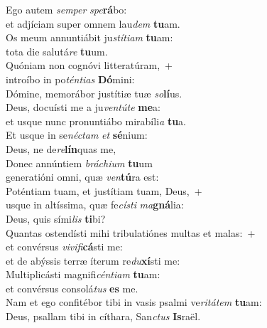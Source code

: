 \evenverse Ego autem \textit{sem}\textit{per} \textit{spe}\textbf{rá}bo:~\*\\
\evenverse et adjíciam super omnem lau\textit{dem} \textbf{tu}am.\\
\oddverse Os meum annuntiábit ju\textit{stí}\textit{ti}\textit{am} \textbf{tu}am:~\*\\
\oddverse tota die salutá\textit{re} \textbf{tu}um.\\
\evenverse Quóniam non cognóvi litteratúram,~+\\
\evenverse  introíbo in po\textit{tén}\textit{ti}\textit{as} \textbf{Dó}mini:~\*\\
\evenverse Dómine, memorábor justítiæ tuæ \textit{so}\textbf{lí}us.\\
\oddverse Deus, docuísti me a ju\textit{ven}\textit{tú}\textit{te} \textbf{me}a:~\*\\
\oddverse et usque nunc pronuntiábo mirabíli\textit{a} \textbf{tu}a.\\
\evenverse Et usque in se\textit{né}\textit{ctam} \textit{et} \textbf{sé}nium:~\*\\
\evenverse Deus, ne de\textit{re}\textbf{lín}quas me,\\
\oddverse Donec annúntiem \textit{brá}\textit{chi}\textit{um} \textbf{tu}um~\*\\
\oddverse generatióni omni, quæ \textit{ven}\textbf{tú}ra est:\\
\evenverse Poténtiam tuam, et justítiam tuam, Deus,~+\\
\evenverse  usque in altíssima, quæ fe\textit{cí}\textit{sti} \textit{ma}\textbf{gná}lia:~\*\\
\evenverse Deus, quis sími\textit{lis} \textbf{ti}bi?\\
\oddverse Quantas ostendísti mihi tribulatiónes multas et malas:~+\\
\oddverse  et convérsus \textit{vi}\textit{vi}\textit{fi}\textbf{cá}sti me:~\*\\
\oddverse et de abýssis terræ íterum re\textit{du}\textbf{xí}sti me:\\
\evenverse Multiplicásti magnifi\textit{cén}\textit{ti}\textit{am} \textbf{tu}am:~\*\\
\evenverse et convérsus consolá\textit{tus} \textbf{es} me.\\
\oddverse Nam et ego confitébor tibi in vasis psalmi ve\textit{ri}\textit{tá}\textit{tem} \textbf{tu}am:~\*\\
\oddverse Deus, psallam tibi in cíthara, San\textit{ctus} \textbf{Is}raël.\\
